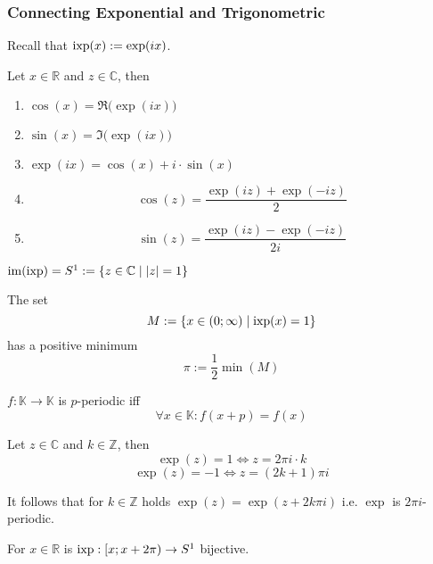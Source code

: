 \subsubsection{Connecting Exponential and Trigonometric}
Recall that \(\operatorname{ixp}(x) := \exp(ix)\).

\begin{proposition}
   Let \(x \in \mathbb{R}\) and \(z \in \mathbb{C}\), then
   \begin{enumerate}[label=\roman*, align=Center]
      \item \(\cos(x) = \Re\big(\exp(ix)\big)\)
      \item \(\sin(x) = \Im\big(\exp(ix)\big)\)
      \item \(\exp(ix) = \cos(x) + i \cdot \sin(x)\)
      \item \[\cos(z) = \frac{\exp(iz) + \exp(-iz)}{2}\]
      \item \[\sin(z) = \frac{\exp(iz) - \exp(-iz)}{2i}\]
   \end{enumerate}
\end{proposition}

\begin{theorem}
   \(\operatorname{im}(\operatorname{ixp}) = S^1 := \{z \in \mathbb{C} \mid \lvert z\rvert = 1\}\)
\end{theorem}
\begin{center}
   
\end{center}

\begin{theorem}
   The set
   \[M := \{x \in (0; \infty) \mid \operatorname{ixp}(x) = 1\}\]
   has a positive minimum
   \[\pi := \frac{1}{2} \min(M)\]
\end{theorem}

\begin{definition}
   \(f: \mathbb{K} \to \mathbb{K}\) is \(p\)-periodic iff
   \[\forall x \in \mathbb{K}: f(x + p) = f(x)\]
\end{definition}

\begin{theorem}
   Let \(z \in \mathbb{C}\) and \(k \in \mathbb{Z}\), then
   \[\exp(z) = 1 \iff z = 2 \pi i \cdot k\]
   \[\exp(z) = -1 \iff z = (2k + 1)\pi i\]
\end{theorem}
\begin{remark}
   It follows that for \(k \in \mathbb{Z}\) holds \(\exp(z) = \exp(z + 2k\pi i)\) i.e. \(\exp\) is \(2\pi i\)-periodic.
\end{remark}

\begin{theorem}
   For \(x \in \mathbb{R}\) is \(\operatorname{ixp}: [x; x + 2\pi) \to S^1\) bijective.
\end{theorem}

